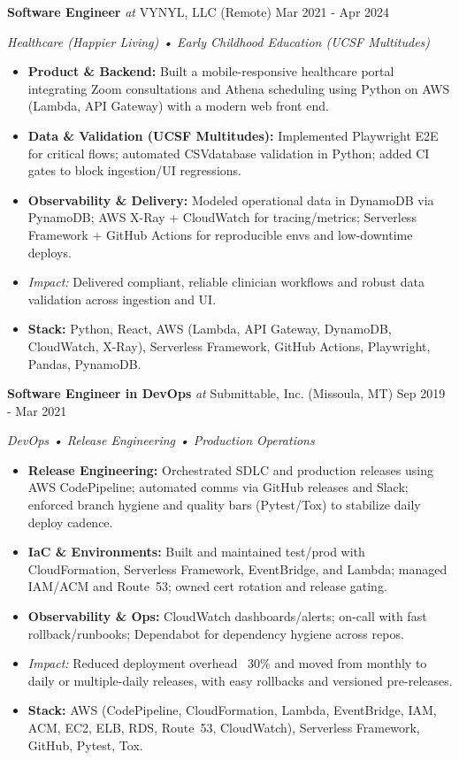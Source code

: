 \documentclass[10pt]{article}
\newcommand{\roleline}[4]{%
  \noindent\textbf{#1} \textit{at} #2 #3 \hfill #4\par
}
\begin{document}
\roleline{Software Engineer}{VYNYL, LLC}{(Remote)}{Mar 2021 - Apr 2024}
\emph{Healthcare (Happier Living) • Early Childhood Education (UCSF Multitudes)}\par
\begin{itemize}
  \item \textbf{Product \& Backend:} Built a mobile-responsive healthcare portal integrating Zoom consultations and Athena scheduling using Python on AWS (Lambda, API Gateway) with a modern web front end.
  \item \textbf{Data \& Validation (UCSF Multitudes):} Implemented Playwright E2E for critical flows; automated CSV\textrightarrow{}database validation in Python; added CI gates to block ingestion/UI regressions.
  \item \textbf{Observability \& Delivery:} Modeled operational data in DynamoDB via PynamoDB; AWS X-Ray + CloudWatch for tracing/metrics; Serverless Framework + GitHub Actions for reproducible envs and low-downtime deploys.
  \item \textit{Impact:} Delivered compliant, reliable clinician workflows and robust data validation across ingestion and UI.
  \item \textbf{Stack:} Python, React, AWS (Lambda, API Gateway, DynamoDB, CloudWatch, X-Ray), Serverless Framework, GitHub Actions, Playwright, Pandas, PynamoDB.
\end{itemize}


\roleline{Software Engineer in DevOps}{Submittable, Inc.}{(Missoula, MT)}{Sep 2019 - Mar 2021}
\emph{DevOps • Release Engineering • Production Operations}\par
\begin{itemize}
  \item \textbf{Release Engineering:} Orchestrated SDLC and production releases using AWS CodePipeline; automated comms via GitHub releases and Slack; enforced branch hygiene and quality bars (Pytest/Tox) to stabilize daily deploy cadence.
  \item \textbf{IaC \& Environments:} Built and maintained test/prod with CloudFormation, Serverless Framework, EventBridge, and Lambda; managed IAM/ACM and Route~53; owned cert rotation and release gating.
  \item \textbf{Observability \& Ops:} CloudWatch dashboards/alerts; on-call with fast rollback/runbooks; Dependabot for dependency hygiene across repos.
  \item \textit{Impact:} Reduced deployment overhead ~30\% and moved from monthly to daily or multiple-daily releases, with easy rollbacks and versioned pre-releases.
  \item \textbf{Stack:} AWS (CodePipeline, CloudFormation, Lambda, EventBridge, IAM, ACM, EC2, ELB, RDS, Route~53, CloudWatch), Serverless Framework, GitHub, Pytest, Tox.
\end{itemize}
\end{document}
